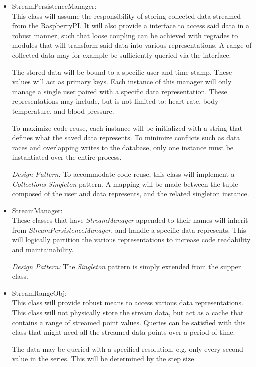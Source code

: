\begin{itemize}

\item StreamPersistenceManager:\\
This class will assume the responsibility of storing collected data streamed from the RaspberryPI. It will also provide a interface to access said data in a robust manner, such that loose coupling can be achieved with regrades to modules that will transform said data into various representations. A range of collected data may for example be sufficiently queried via the interface.

The stored data will be bound to a specific user and time-stamp. These values will act as primary keys. Each instance of this manager will only manage a single user paired with a specific data representation. These representations may include, but is not limited to: heart rate, body temperature, and blood pressure.

To maximize code reuse, each instance will be initialized with a string that defines what the saved data represents. To minimize conflicts such as data races and overlapping writes to the database, only one instance must be instantiated over the entire process.

\emph{Design Pattern:}
To accommodate code reuse, this class will implement a \textit{Collections Singleton} pattern. A mapping will be made between the tuple composed of the user and data represents, and the related singleton instance.

\item StreamManager:\\
These classes that have \textit{StreamManager} appended to their names will inherit from \textit{StreamPersistenceManager}, and handle a specific data represents. This will logically partition the various representations to increase code readability and maintainability.

\emph{Design Pattern:}
The \textit{Singleton} pattern is simply extended from the supper class.


\item StreamRangeObj:\\
This class will provide robust means to access various data representations. This class will not physically store the stream data, but act as a cache that contains a range of streamed point values. Queries can be satisfied with this class that might need all the streamed data points over a period of time.

The data may be queried with a specified resolution, e.g. only every second value in the series. This will be determined by the step size.



\end{itemize}
